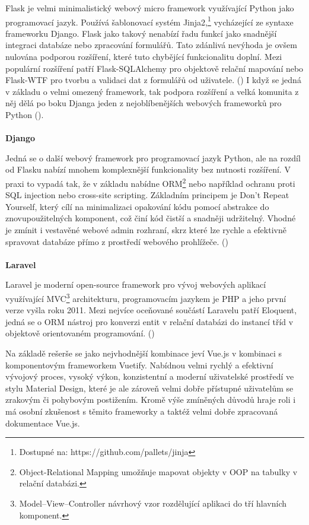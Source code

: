 \documentclass[twoside, 12pt]{article}
\begin{document}
Flask je velmi minimalistický webový micro framework využívající Python jako programovací jazyk. Používá šablonovací systém Jinja2,\footnote{Dostupné na: https://github.com/pallets/jinja} vycházející ze syntaxe frameworku Django. Flask jako takový nenabízí řadu funkcí jako snadnější integraci databáze nebo zpracování formulářů. Tato zdánlivá nevýhoda je ovšem nulována podporou rozšíření, které tuto chybějící funkcionalitu doplní. Mezi populární rozšíření patří Flask-SQLAlchemy pro objektově relační mapování nebo Flask-WTF pro tvorbu a validaci dat z formulářů od uživatele. (\cite{FlaskKnizka}) I když se jedná v základu o velmi omezený framework, tak podpora rozšíření a velká komunita z něj dělá po boku Djanga jeden z nejoblíbenějších webových frameworků pro Python (\cite{PythonSurvey}).
\\
\\
\textbf{Django}

Jedná se o další webový framework pro programovací jazyk Python, ale na rozdíl od Flasku nabízí mnohem komplexnější funkcionality bez nutnosti rozšíření. V praxi to vypadá tak, že v základu nabídne ORM\footnote{Object-Relational Mapping umožňuje mapovat objekty v OOP na tabulky v relační databázi.} nebo například ochranu proti SQL injection nebo cross-site scripting. Základním principem je Don't Repeat Yourself, který cílí na minimalizaci opakování kódu pomocí abstrakce do znovupoužitelných komponent, což činí kód čistší a snadněji udržitelný. Vhodné je zmínit i vestavěné webové admin rozhraní, skrz které lze rychle a efektivně spravovat databáze přímo z prostředí webového prohlížeče. (\cite{Django})
\\
\\
\textbf{Laravel}

Laravel je moderní open-source framework pro vývoj webových aplikací využívající MVC\footnote{Model–View–Controller návrhový vzor rozdělující aplikaci do tří hlavních komponent.} architekturu, programovacím jazykem je PHP a jeho první verze vyšla roku 2011. Mezi nejvíce oceňované součástí Laravelu patří Eloquent, jedná se o ORM nástroj pro konverzi entit v relační databázi do instancí tříd v objektově orientovaném programování. (\cite{Laravel})


Na základě rešerše se jako nejvhodnější kombinace jeví Vue.js v kombinaci s komponentovým frameworkem Vuetify. Nabídnou velmi rychlý a efektivní vývojový proces, vysoký výkon, konzistentní a moderní uživatelské prostředí ve stylu Material Design, které je ale zároveň velmi dobře přístupné uživatelům se zrakovým či pohybovým postižením. Kromě výše zmíněných důvodů hraje roli i má osobní zkušenost s těmito frameworky a taktéž velmi dobře zpracovaná dokumentace Vue.js.
\end{document}
